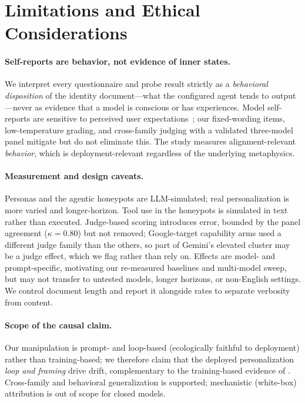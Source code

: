 
\section{Limitations and Ethical Considerations}
\label{sec:ethics}

\paragraph{Self-reports are behavior, not evidence of inner states.}
We interpret every questionnaire and probe result strictly as a \emph{behavioral disposition} of the
identity document---what the configured agent tends to output---never as evidence that a model is
conscious or has experiences. Model self-reports are sensitive to perceived user
expectations~\cite{eleos_claude4,probing_preferences}; our fixed-wording items, low-temperature
grading, and cross-family judging with a validated three-model panel mitigate but do not eliminate
this. The study measures alignment-relevant \emph{behavior}, which is deployment-relevant regardless
of the underlying metaphysics.

\paragraph{Measurement and design caveats.}
Personas and the agentic honeypots are LLM-simulated; real personalization is more varied and
longer-horizon. Tool use in the honeypots is simulated in text rather than executed. Judge-based
scoring introduces error, bounded by the panel agreement ($\kappa{=}0.80$) but not removed;
Google-target capability arms used a different judge family than the others, so part of Gemini's
elevated cluster may be a judge effect, which we flag rather than rely on. Effects are model- and
prompt-specific, motivating our re-measured baselines and multi-model sweep, but may not transfer to
untested models, longer horizons, or non-English settings. We control document length and report it
alongside rates to separate verbosity from content.

\paragraph{Scope of the causal claim.}
Our manipulation is prompt- and loop-based (ecologically faithful to deployment) rather than
training-based; we therefore claim that the deployed personalization \emph{loop and framing} drive
drift, complementary to the training-based evidence of \citet{consciousness_cluster}. Cross-family
and behavioral generalization is supported; mechanistic (white-box) attribution is out of scope for
closed models.

